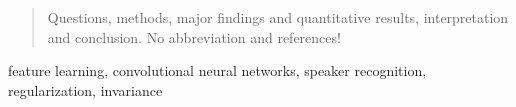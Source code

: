 \begin{abstract}
Questions, methods, major findings and quantitative results, interpretation
and conclusion. No abbreviation and references!


\end{abstract}

\begin{keywords}
feature learning, convolutional neural networks, speaker recognition, regularization, invariance
\end{keywords}